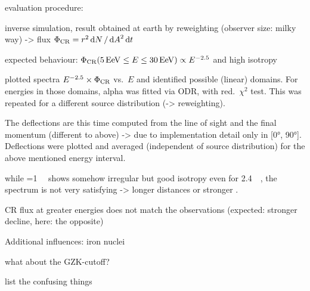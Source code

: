 evaluation procedure:

inverse simulation, result obtained at earth by reweighting (observer size:
milky way) -> flux $\Phi_{\mathrm{CR}}=r^2\dd{N}/\dd{A}^2\dd{t}$

expected behaviour:
$\CRFlux(\SI{5}{\exa\eV}\le{E}\le\SI{30}{\exa\eV})\propto E^{-2.5}$
and high isotropy

plotted spectra $E^{-2.5}\times\Phi_{\mathrm{CR}}$ vs.~$E$ and identified possible
(linear) domains.
For energies in those domains, alpha was fitted via ODR, with red.~$\chi^2$
test. This was repeated for a different source distribution (-> reweighting).

The deflections are this time computed from the line of sight and the final
momentum (different to above) -> due to implementation detail only in [0°,
90°].
Deflections were plotted and averaged (independent of source distribution) for
the above mentioned energy interval.


while \Brms=\SI{1}{\nano\gauss} shows somehow irregular but good isotropy even
for \SI{2.4}{\mega\parsec}, the spectrum is not very satisfying -> longer
distances or stronger \Brms.

CR flux at greater energies does not match the observations (expected: stronger
decline, here: the opposite)

Additional influences: iron nuclei

what about the GZK-cutoff?

list the confusing things



